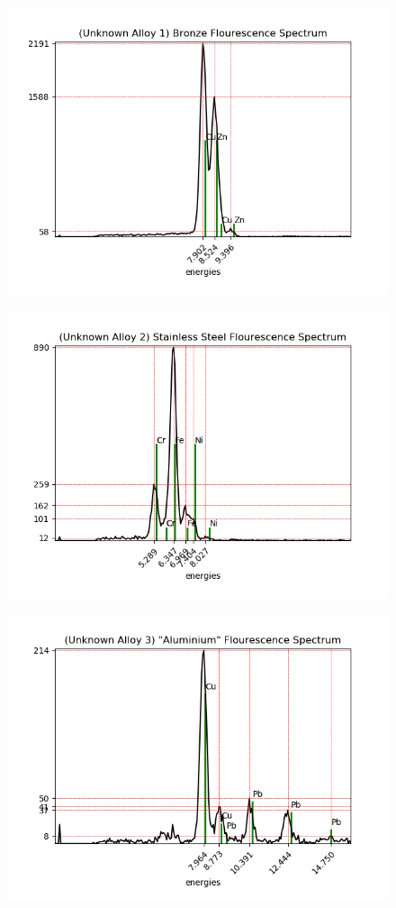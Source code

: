 \documentclass[8pt, a4paper]{article}
\begin{document}
\begin{figure}[h]
\includegraphics{fbronze}
\end{figure}

\begin{figure}[h]
\includegraphics{fssteel}
\end{figure}

\begin{figure}[h]
\includegraphics{fCuPb}
\end{figure}
\end{document}
